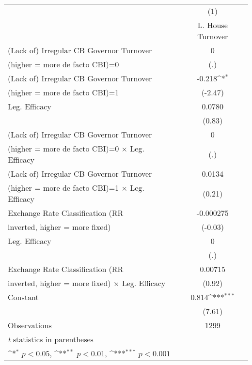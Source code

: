 \begin{table}[htbp]\centering
\def\sym#1{\ifmmode^{#1}\else\(^{#1}\)\fi}
\caption{\label{llpFEDF}}
\begin{tabular}{l*{1}{c}}
\toprule
                                        &\multicolumn{1}{c}{(1)}\\
                                        &\multicolumn{1}{c}{L. House Turnover}\\
\midrule
(Lack of) Irregular CB Governor Turnover&        0         \\
(higher = more de facto CBI)=0          &      (.)         \\
\addlinespace
(Lack of) Irregular CB Governor Turnover&   -0.218\sym{*}  \\
(higher = more de facto CBI)=1          &  (-2.47)         \\
\addlinespace
Leg. Efficacy                           &   0.0780         \\
                                        &   (0.83)         \\
\addlinespace
(Lack of) Irregular CB Governor Turnover&        0         \\
(higher = more de facto CBI)=0 $\times$ Leg. Efficacy&      (.)         \\
\addlinespace
(Lack of) Irregular CB Governor Turnover&   0.0134         \\
(higher = more de facto CBI)=1 $\times$ Leg. Efficacy&   (0.21)         \\
\addlinespace
Exchange Rate Classification (RR        &-0.000275         \\
inverted, higher = more fixed)          &  (-0.03)         \\
\addlinespace
Leg. Efficacy                           &        0         \\
                                        &      (.)         \\
\addlinespace
Exchange Rate Classification (RR        &  0.00715         \\
inverted, higher = more fixed) $\times$ Leg. Efficacy&   (0.92)         \\
\addlinespace
Constant                                &    0.814\sym{***}\\
                                        &   (7.61)         \\
\midrule
Observations                            &     1299         \\
\bottomrule
\multicolumn{2}{l}{\footnotesize \textit{t} statistics in parentheses}\\
\multicolumn{2}{l}{\footnotesize \sym{*} \(p<0.05\), \sym{**} \(p<0.01\), \sym{***} \(p<0.001\)}\\
\end{tabular}
\end{table}
